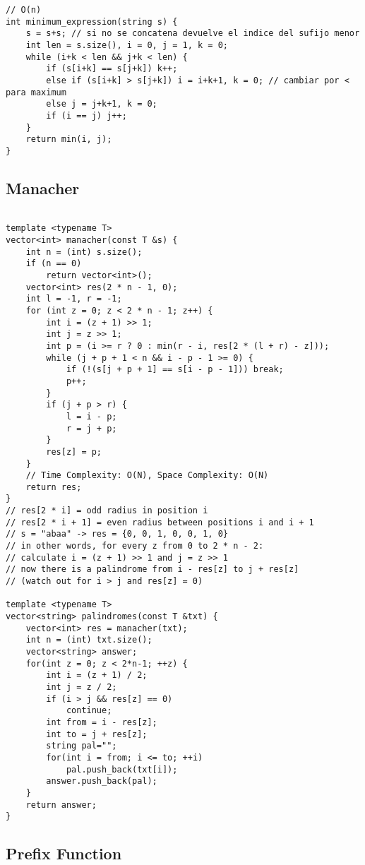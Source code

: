 \documentclass[10pt,letterpaper,twocolumn,twosided]{article}
\begin{document}
\begin{lstlisting}
// O(n)
int minimum_expression(string s) {
    s = s+s; // si no se concatena devuelve el indice del sufijo menor
    int len = s.size(), i = 0, j = 1, k = 0;
    while (i+k < len && j+k < len) {
        if (s[i+k] == s[j+k]) k++;
        else if (s[i+k] > s[j+k]) i = i+k+1, k = 0; // cambiar por < para maximum
        else j = j+k+1, k = 0;
        if (i == j) j++;
    }
    return min(i, j);
}
\end{lstlisting}

\subsection{Manacher}
\begin{lstlisting}

template <typename T>
vector<int> manacher(const T &s) {
    int n = (int) s.size();
    if (n == 0)
        return vector<int>();
    vector<int> res(2 * n - 1, 0);
    int l = -1, r = -1;
    for (int z = 0; z < 2 * n - 1; z++) {
        int i = (z + 1) >> 1;
        int j = z >> 1;
        int p = (i >= r ? 0 : min(r - i, res[2 * (l + r) - z]));
        while (j + p + 1 < n && i - p - 1 >= 0) {
            if (!(s[j + p + 1] == s[i - p - 1])) break;
            p++;
        }
        if (j + p > r) {
            l = i - p;
            r = j + p;
        }
        res[z] = p;
    }
    // Time Complexity: O(N), Space Complexity: O(N)
    return res;
}
// res[2 * i] = odd radius in position i
// res[2 * i + 1] = even radius between positions i and i + 1
// s = "abaa" -> res = {0, 0, 1, 0, 0, 1, 0}
// in other words, for every z from 0 to 2 * n - 2:
// calculate i = (z + 1) >> 1 and j = z >> 1
// now there is a palindrome from i - res[z] to j + res[z]
// (watch out for i > j and res[z] = 0)

template <typename T>
vector<string> palindromes(const T &txt) {
    vector<int> res = manacher(txt);
    int n = (int) txt.size();
    vector<string> answer;
    for(int z = 0; z < 2*n-1; ++z) {
        int i = (z + 1) / 2;
        int j = z / 2;
        if (i > j && res[z] == 0)
            continue;
        int from = i - res[z];
        int to = j + res[z];
        string pal="";
        for(int i = from; i <= to; ++i)
            pal.push_back(txt[i]);
        answer.push_back(pal);
    }
    return answer;
}
\end{lstlisting}

\subsection{Prefix Function}
\end{document}
